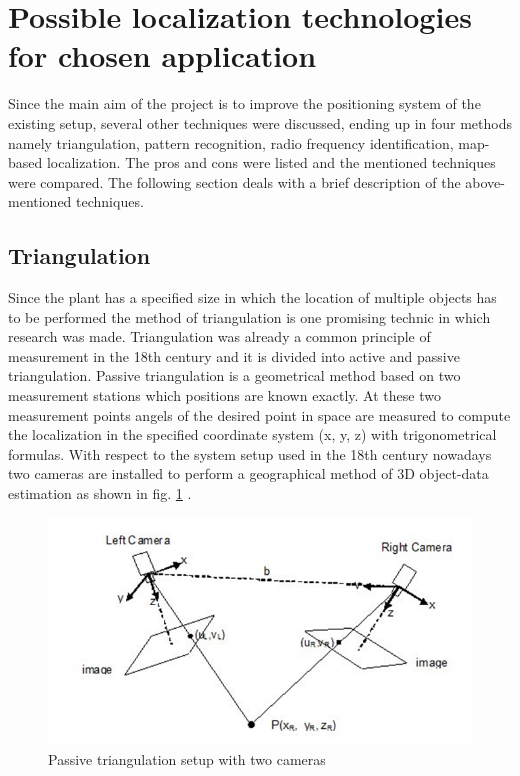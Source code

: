 \section{Possible localization technologies for chosen application} \label{Sec_selectionp}

Since the main aim of the project is to improve the positioning system of the existing setup, several other techniques were discussed, ending up in four methods namely triangulation, pattern recognition, radio frequency identification, map-based localization. The pros and cons were listed and the mentioned techniques were compared. The following section deals with a brief description of the above-mentioned techniques.\\

\subsection{Triangulation} %
Since the plant has a specified size in which the location of multiple objects has to be performed the method of triangulation is one promising technic in which research was made. 
Triangulation was already a common principle of measurement in the 18th century and it is divided into active and passive triangulation. Passive triangulation is a geometrical method based on two measurement stations which positions are known exactly. At these two measurement points angels of the desired point in space are measured to compute the localization in the specified coordinate system (x, y, z) with trigonometrical formulas.
With respect to the system setup used in the 18th century nowadays two cameras are installed to perform a geographical method of 3D object-data estimation as shown in fig. \ref{Triangulation} \cite{Prinzip3DVideometrie.}.
\begin{figure}[!htbp]
\centering
\includegraphics[width = 16cm]{Pictures/Triangulation}
\caption{Passive triangulation setup with two cameras}
\label{Triangulation}
\end{figure}\\
